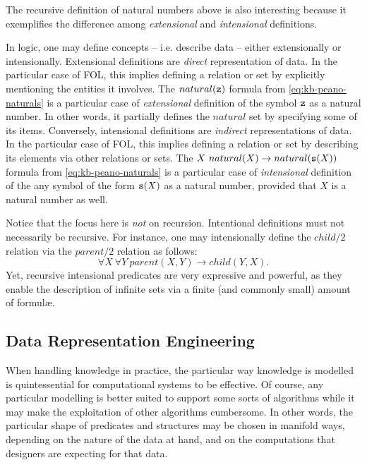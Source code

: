 \documentclass[12pt,a4paper,openright,twoside]{book}
\begin{document}
The recursive definition of natural numbers above is also interesting because it exemplifies the difference among \emph{extensional} and \emph{intensional} definitions.

In logic, one may define concepts -- i.e. describe data -- either extensionally or intensionally.
%
Extensional definitions are \emph{direct} representation of data.
%
In the particular case of FOL, this implies defining a relation or set by explicitly mentioning the entities it involves.
%
The $natural(\mathtt{z})$ formula from \cref{eq:kb-peano-naturals} is a particular case of \emph{extensional} definition of the symbol $\mathtt{z}$ as a natural number.
%
In other words, it partially defines the $natural$ set by specifying some of its items.
%
Conversely, intensional definitions are \emph{indirect} representations of data.
%
In the particular case of FOL, this implies defining a relation or set by describing its elements via other relations or sets.
%
The $X\ natural(X) \rightarrow natural(\functor{s}(X))$ formula from \cref{eq:kb-peano-naturals} is a particular case of \emph{intensional} definition of the any symbol of the form $\mathtt{s}(X)$ as a natural number, provided that $X$ is a natural number as well.

Notice that the focus here is \emph{not} on recursion.
%
Intentional definitions must not necessarily be recursive.
%
For instance, one may intensionally define the $child/2$ relation via the $parent/2$ relation as follows:
%
\begin{equation*}
    \forall X ~ \forall Y\ parent(X, Y) \rightarrow child(Y, X).
\end{equation*}
%
Yet, recursive intensional predicates are very expressive and powerful, as they enable the description of infinite sets via a finite (and commonly small) amount of formul\ae{}.

\subsection{Data Representation Engineering}

When handling knowledge in practice, the particular way knowledge is modelled is quintessential for computational systems to be effective.
%
Of course, any particular modelling is better suited to support some sorts of algorithms while it may make the exploitation of other algorithms cumbersome.
%
In other words, the particular shape of predicates and structures may be chosen in manifold ways, depending on the nature of the data at hand, and on the computations that designers are expecting for that data.
\end{document}
